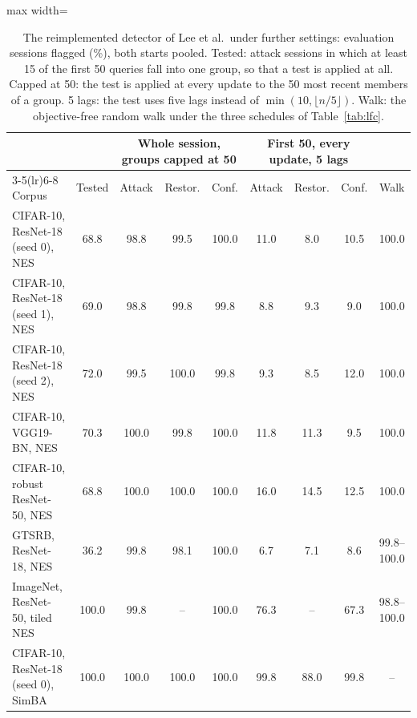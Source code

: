 \begin{table}[!tbp]
\centering\footnotesize\setlength{\tabcolsep}{3pt}
\caption{The reimplemented detector of Lee et al.\ under further settings: evaluation sessions flagged (\%), both starts pooled. Tested: attack sessions in which at least 15 of the first 50 queries fall into one group, so that a test is applied at all. Capped at 50: the test is applied at every update to the 50 most recent members of a group. 5 lags: the test uses five lags instead of $\min(10,\lfloor n/5\rfloor)$. Walk: the objective-free random walk under the three schedules of Table~\ref{tab:lfc}.}
\label{tab:lfcall}
\vspace{3pt}
\begin{adjustbox}{max width=\textwidth}
\begin{tabular}{lcccccccc}
\toprule
& & \multicolumn{3}{c}{Whole session, groups capped at 50} & \multicolumn{3}{c}{First 50, every update, 5 lags} & \\
\cmidrule(lr){3-5}\cmidrule(lr){6-8}
Corpus & Tested & Attack & Restor. & Conf. & Attack & Restor. & Conf. & Walk \\
\midrule
CIFAR-10, ResNet-18 (seed 0), NES & 68.8 & 98.8 & 99.5 & 100.0 & 11.0 & 8.0 & 10.5 & 100.0 \\
CIFAR-10, ResNet-18 (seed 1), NES & 69.0 & 98.8 & 99.8 & 99.8 & 8.8 & 9.3 & 9.0 & 100.0 \\
CIFAR-10, ResNet-18 (seed 2), NES & 72.0 & 99.5 & 100.0 & 99.8 & 9.3 & 8.5 & 12.0 & 100.0 \\
CIFAR-10, VGG19-BN, NES & 70.3 & 100.0 & 99.8 & 100.0 & 11.8 & 11.3 & 9.5 & 100.0 \\
CIFAR-10, robust ResNet-50, NES & 68.8 & 100.0 & 100.0 & 100.0 & 16.0 & 14.5 & 12.5 & 100.0 \\
GTSRB, ResNet-18, NES & 36.2 & 99.8 & 98.1 & 100.0 & 6.7 & 7.1 & 8.6 & 99.8--100.0 \\
ImageNet, ResNet-50, tiled NES & 100.0 & 99.8 & -- & 100.0 & 76.3 & -- & 67.3 & 98.8--100.0 \\
CIFAR-10, ResNet-18 (seed 0), SimBA & 100.0 & 100.0 & 100.0 & 100.0 & 99.8 & 88.0 & 99.8 & -- \\
\bottomrule
\end{tabular}
\end{adjustbox}
\end{table}
